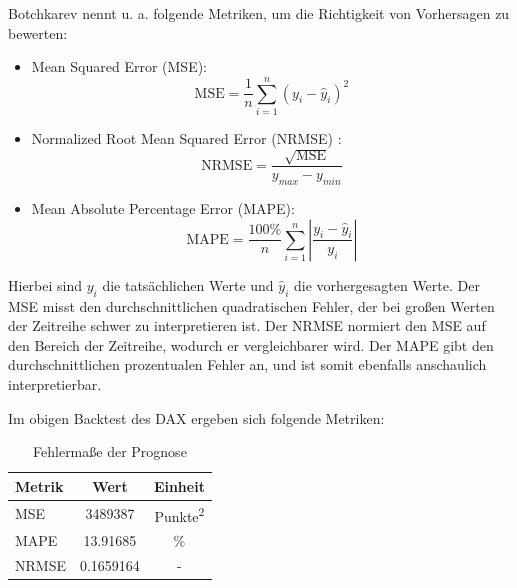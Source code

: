 \begin{lemma}
Botchkarev \cite{botchkarev_performance_2019} nennt u. a. folgende Metriken, um die Richtigkeit von Vorhersagen zu bewerten:
\begin{itemize}
    \item Mean Squared Error (MSE): $$\text{MSE} = \frac{1}{n} \sum_{i=1}^n (y_i - \hat{y}_i)^2$$
    \item Normalized Root Mean Squared Error (NRMSE) : $$\text{NRMSE} = \frac{\sqrt{\text{MSE}}}{y_{max} - y_{min}}$$
    \item Mean Absolute Percentage Error (MAPE): $$\text{MAPE} = \frac{100\%}{n} \sum_{i=1}^n \left|\frac{y_i - \hat{y}_i}{y_i}\right|$$
\end{itemize}

Hierbei sind $y_i$ die tatsächlichen Werte und $\hat{y}_i$ die vorhergesagten Werte.
Der MSE misst den durchschnittlichen quadratischen Fehler, der bei großen Werten der Zeitreihe schwer 
zu interpretieren ist. Der NRMSE normiert den MSE auf den Bereich der Zeitreihe,
wodurch er vergleichbarer wird. Der MAPE gibt den durchschnittlichen prozentualen Fehler an, und ist
somit ebenfalls anschaulich interpretierbar.

\end{lemma}

\begin{bsp}
Im obigen Backtest des DAX ergeben sich folgende Metriken:

\begin{table}[h]
    \centering
    \begin{tabular}{lcc}
        \toprule
        Metrik & Wert & Einheit \\
        \midrule
        MSE    & 3489387 & Punkte\textsuperscript{2} \\
        MAPE   & 13.91685   & \% \\
        NRMSE  & 0.1659164 & - \\
        \bottomrule
    \end{tabular}
    \caption{Fehlermaße der Prognose}
    \label{tab:metrics}
\end{table}

\end{bsp}

